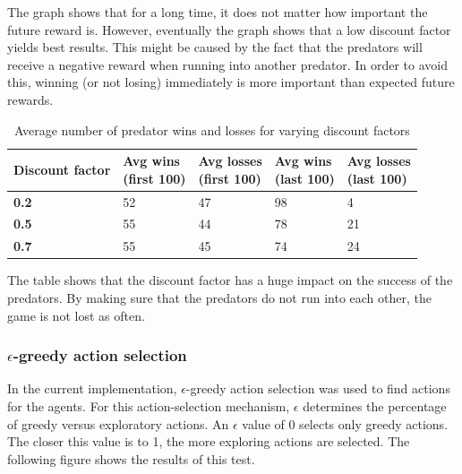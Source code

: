 The graph shows that for a long time, it does not matter how important the future reward is. However, eventually the graph shows that a low discount factor yields best results. This might be caused by the fact that the predators will receive a negative reward when running into another predator. In order to avoid this, winning (or not losing) immediately is more important than expected future rewards.

\begin{table}[H]
\begin{center}
\begin{tabular}{| l | l | l | l | l |}
\hline
\parbox{2cm}{\textbf{Discount factor}} & \parbox{2cm}{\textbf{Avg wins \\ (first 100)}} & \parbox{2cm}{\textbf{Avg losses \\ (first 100)}} & \parbox{2cm}{\textbf{Avg wins \\ (last 100)}} & \parbox{2cm}{\textbf{Avg losses \\ (last 100)}} \\
\hline
\textbf{0.2} & 52 & 47 & 98 & 4 \\
\hline
\textbf{0.5} & 55 & 44 & 78 & 21 \\
\hline
\textbf{0.7} & 55 & 45 & 74 & 24 \\
\hline
\end{tabular}
\caption{Average number of predator wins and losses for varying discount factors}
\end{center}
\end{table}

The table shows that the discount factor has a huge impact on the success of the predators. By making sure that the predators do not run into each other, the game is not lost as often.

\subsubsection{$\epsilon$-greedy action selection}
In the current implementation, $\epsilon$-greedy action selection was used to find actions for the agents. For this action-selection mechanism, $\epsilon$ determines the percentage of greedy versus exploratory actions. An $\epsilon$ value of 0 selects only greedy actions. The closer this value is to 1, the more exploring actions are selected. The following figure shows the results of this test.

